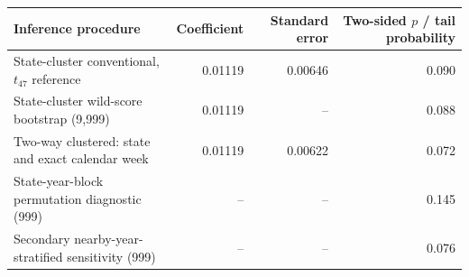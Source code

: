 \begin{tabular}{lrrr}
\toprule
Inference procedure & Coefficient & Standard error & Two-sided $p$ / tail probability \\
\midrule
State-cluster conventional, $t_{47}$ reference & 0.01119 & 0.00646 & 0.090 \\
State-cluster wild-score bootstrap (9,999) & 0.01119 & -- & 0.088 \\
Two-way clustered: state and exact calendar week & 0.01119 & 0.00622 & 0.072 \\
State-year-block permutation diagnostic (999) & -- & -- & 0.145 \\
Secondary nearby-year-stratified sensitivity (999) & -- & -- & 0.076 \\
\bottomrule
\end{tabular}
